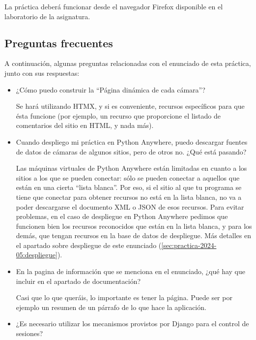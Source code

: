 La práctica deberá funcionar desde el navegador Firefox disponible en el laboratorio de la asignatura.

\subsection{Preguntas frecuentes}
\label{sec:practica-2024-05:preguntas}

A continuación, algunas preguntas relacionadas con el enunciado de esta práctica, junto con sus respuestas:

\begin{itemize}

\item ¿Cómo puedo construir la ``Página dinámica de cada cámara''?

  Se hará utilizando HTMX, y si es conveniente, recursos específicos para que ésta funcione (por ejemplo, un recurso que proporcione el listado de comentarios del sitio en HTML, y nada más).
  
\item Cuando despliego mi práctica en Python Anywhere, puedo descargar fuentes de datos de cámaras de algunos sitios, pero de otros no. ¿Qué está pasando?

  Las máquinas virtuales de Python Anywhere están limitadas en cuanto a los sitios a los que se pueden conectar: sólo se pueden conectar a aquellos que están en una cierta ``lista blanca''. Por eso, si el sitio al que tu programa se tiene que conectar para obtener recursos no está en la lista blanca, no va a poder descargarse el documento XML o JSON de esos recursos. Para evitar problemas, en el caso de despliegue en Python Anywhere pedimos que funcionen bien los recursos reconocidos que están en la lista blanca, y para los demás, que tengan recursos en la base de datos de despliegue. Más detalles en el apartado sobre despliegue de este enunciado (\ref{sec:practica-2024-05:despliegue}).
  
\item En la pagina de información que se menciona en el enunciado, ¿qué hay que incluir en el apartado de documentación?

Casi que lo que queráis, lo importante es tener la página. Puede ser por ejemplo un resumen de un párrafo de lo que hace la aplicación.
  
\item ¿Es necesario utilizar los mecanismos provistos por Django para el control de sesiones?


\end{itemize}
